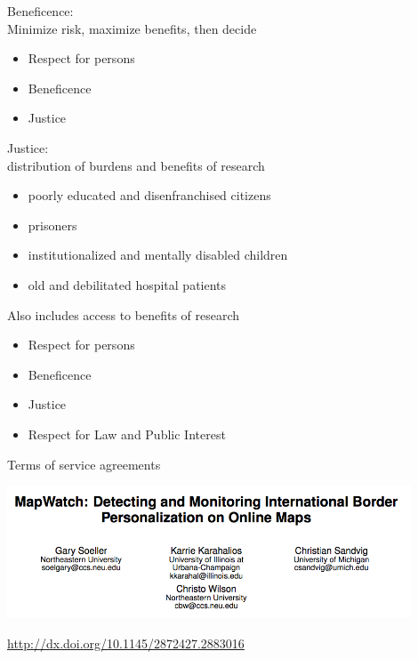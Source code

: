 \documentclass{beamer}
\def\vf{\vfill}
\begin{document}
\begin{frame}

Beneficence:\\
Minimize risk, maximize benefits, then decide

\end{frame}
\begin{frame}

\begin{itemize}
\item Respect for persons
\item Beneficence
\item Justice
\end{itemize}

\end{frame}
\begin{frame}

Justice:\\
distribution of burdens and benefits of research
\pause
\begin{itemize}
\item poorly educated and disenfranchised citizens
\item prisoners
\item institutionalized and mentally disabled children
\item old and debilitated hospital patients
\end{itemize}
\pause
Also includes access to benefits of research

\end{frame}
\begin{frame}

\begin{itemize}
\item Respect for persons
\item Beneficence
\item Justice
\item Respect for Law and Public Interest
\end{itemize}

\end{frame}
\begin{frame}

Terms of service agreements

\end{frame}
\begin{frame}

\begin{center}
\includegraphics[width=0.9\textwidth]{figures/soeller_mapwatch_2016_title.png}
\end{center}

\vf
\url{http://dx.doi.org/10.1145/2872427.2883016}
\end{frame}
\end{document}
